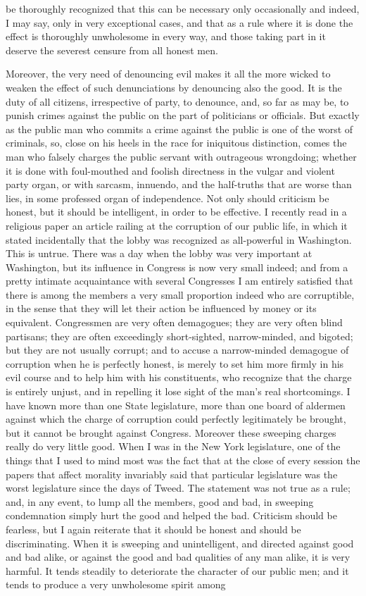 \documentclass[a4paper]{amsbook}
\begin{document}
be thoroughly recognized that this can be necessary only occasionally and indeed, I may say, only in very exceptional cases, and that as a rule where it is done the effect is thoroughly unwholesome in every way, and those taking part in it deserve the severest censure from all honest men.

Moreover, the very need of denouncing evil makes it all the more wicked to weaken the effect of such denunciations by denouncing also the good. It is the duty of all citizens, irrespective of party, to denounce, and, so far as may be, to punish crimes against the public on the part of politicians or officials. But exactly as the public man who commits a crime against the public is one of the worst of criminals, so, close on his heels in the race for iniquitous distinction, comes the man who falsely charges the public servant with outrageous wrongdoing; whether it is done with foul-mouthed and foolish directness in the vulgar and violent party organ, or with sarcasm, innuendo, and the half-truths that are worse than lies, in some professed organ of independence. Not only should criticism be honest, but it should be intelligent, in order to be effective. I recently read in a religious paper an article railing at the corruption of our public life, in which it stated incidentally that the lobby was recognized as all-powerful in Washington. This is untrue. There was a day when the lobby was very important at Washington, but its influence in Congress is now very small indeed; and from a pretty intimate acquaintance with several Congresses I am entirely satisfied that there is among the members a very small proportion indeed who are corruptible, in the sense that they will let their action be influenced by money or its equivalent. Congressmen are very often demagogues; they are very often blind partisans; they are often exceedingly short-sighted, narrow-minded, and bigoted; but they are not usually corrupt; and to accuse a narrow-minded demagogue of corruption when he is perfectly honest, is merely to set him more firmly in his evil course and to help him with his constituents, who recognize that the charge is entirely unjust, and in repelling it lose sight of the man's real shortcomings. I have known more than one State legislature, more than one board of aldermen against which the charge of corruption could perfectly legitimately be brought, but it cannot be brought against Congress. Moreover these sweeping charges really do very little good. When I was in the New York legislature, one of the things that I used to mind most was the fact that at the close of every session the papers that affect morality invariably said that particular legislature was the worst legislature since the days of Tweed. The statement was not true as a rule; and, in any event, to lump all the members, good and bad, in sweeping condemnation simply hurt the good and helped the bad. Criticism should be fearless, but I again reiterate that it should be honest and should be discriminating. When it is sweeping and unintelligent, and directed against good and bad alike, or against the good and bad qualities of any man alike, it is very harmful. It tends steadily to deteriorate the character of our public men; and it tends to produce a very unwholesome spirit among 
\end{document}
